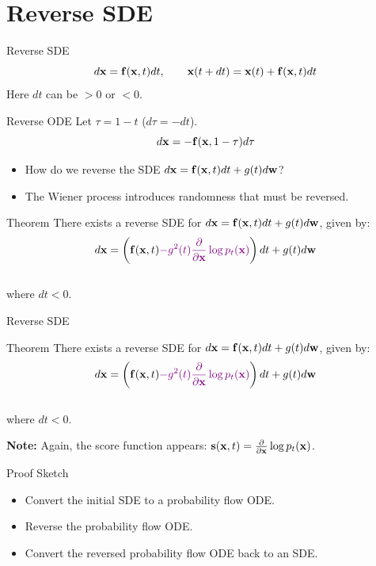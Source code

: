 \documentclass{beamer}
\begin{document}
\section{Reverse SDE}
\begin{frame}{Reverse SDE}
	\vspace{-0.3cm}
	\[
		d\mathbf{x} = \mathbf{f}(\mathbf{x}, t) dt,\qquad \mathbf{x}(t + dt) = \mathbf{x}(t) + \mathbf{f}(\mathbf{x}, t) dt
	\]
	Here $dt$ can be $>0$ or $<0$.
	\begin{block}{Reverse ODE}
		Let $\tau = 1 - t$ ($d\tau = -dt$).
		\vspace{-0.3cm}
		\[
			d\mathbf{x} = - \mathbf{f}(\mathbf{x}, 1 - \tau) d\tau
		\]
	\end{block}
	\vspace{-0.5cm}
	\begin{itemize}
		\item How do we reverse the SDE $d\mathbf{x} = \mathbf{f}(\mathbf{x}, t) dt + g(t) d \mathbf{w}$? 
		\item The Wiener process introduces randomness that must be reversed.
	\end{itemize}
	\vspace{-0.3cm}
	\begin{block}{Theorem}
		There exists a reverse SDE for $d\mathbf{x} = \mathbf{f}(\mathbf{x}, t) dt + g(t) d \mathbf{w}$, given by:
		\vspace{-0.3cm}
		\[
			d\mathbf{x} = \left(\mathbf{f}(\mathbf{x}, t) {\color{violet}- g^2(t) \frac{\partial}{\partial \mathbf{x}}\log p_t(\mathbf{x})}\right) dt + g(t) d \mathbf{w}
		\]
		\vspace{-0.5cm}\\
		where $dt<0$.
	\end{block}
\end{frame}
\begin{frame}{Reverse SDE}
	\begin{block}{Theorem}
		There exists a reverse SDE for $d\mathbf{x} = \mathbf{f}(\mathbf{x}, t) dt + g(t) d \mathbf{w}$, given by:
		\vspace{-0.3cm}
		\[
			d\mathbf{x} = \left(\mathbf{f}(\mathbf{x}, t) {\color{violet}- g^2(t) \frac{\partial}{\partial \mathbf{x}}\log p_t(\mathbf{x})}\right) dt + g(t) d \mathbf{w}
		\]
		\vspace{-0.5cm}\\
		where $dt<0$.
	\end{block}
	\textbf{Note:} Again, the score function appears: $\mathbf{s}(\mathbf{x}, t) = \frac{\partial}{\partial \mathbf{x}} \log p_t(\mathbf{x})$.
	\begin{block}{Proof Sketch}
		\begin{itemize}
			\item Convert the initial SDE to a probability flow ODE.
			\item Reverse the probability flow ODE.
			\item Convert the reversed probability flow ODE back to an SDE.
		\end{itemize}
	\end{block}
\end{frame}
\end{document}
